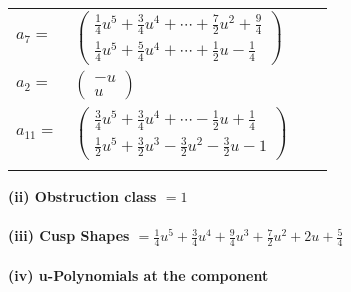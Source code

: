 \documentclass[1p]{elsarticle_modified}
\theoremstyle{definition}
\begin{document}
\begin{tabular}{m{7pt} m{180pt} m{7pt} m{180pt} }
\flushright $a_{7}=$&$\begin{pmatrix}\frac{1}{4} u^5+\frac{3}{4} u^4+\cdots+\frac{7}{2} u^2+\frac{9}{4}\\\frac{1}{4} u^5+\frac{5}{4} u^4+\cdots+\frac{1}{2} u-\frac{1}{4}\end{pmatrix}$ \\
\flushright $a_{2}=$&$\begin{pmatrix}- u\\u\end{pmatrix}$ \\
\flushright $a_{11}=$&$\begin{pmatrix}\frac{3}{4} u^5+\frac{3}{4} u^4+\cdots-\frac{1}{2} u+\frac{1}{4}\\\frac{1}{2} u^5+\frac{3}{2} u^3-\frac{3}{2} u^2-\frac{3}{2} u-1\end{pmatrix}$\\&\end{tabular}
\flushleft \textbf{(ii) Obstruction class $= 1$}\\~\\
\flushleft \textbf{(iii) Cusp Shapes $= \frac{1}{4} u^5+\frac{3}{4} u^4+\frac{9}{4} u^3+\frac{7}{2} u^2+2 u+\frac{5}{4}$}\\~\\
\newpage\renewcommand{\arraystretch}{1}
\flushleft \textbf{(iv) u-Polynomials at the component}\newline \\
\end{document}
